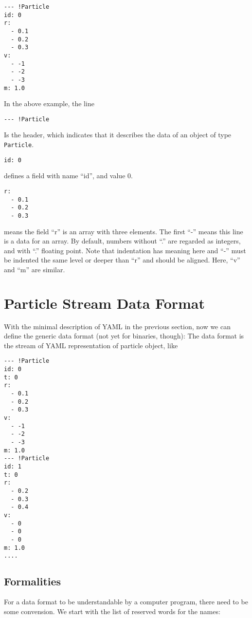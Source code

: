 \documentclass[5p,authoryear]{elsarticle}
\begin{document}
\begin{verbatim}
--- !Particle
id: 0
r:
  - 0.1
  - 0.2
  - 0.3
v:
  - -1
  - -2
  - -3
m: 1.0
\end{verbatim}

In the above example, the line

\begin{verbatim}
--- !Particle
\end{verbatim}
Is the header, which indicates that it describes the data of an object
of type {\tt Particle}.


\begin{verbatim}
id: 0
\end{verbatim}
defines a field with name ``id'', and value 0.
\begin{verbatim}
r:
  - 0.1
  - 0.2
  - 0.3
\end{verbatim}
means the field ``r'' is an array with three elements. The
first ``-'' means this line is a data for an array.
By default, numbers without ``.'' are regarded as integers, and with
``.'' floating point. Note that indentation has meaning here and ``-''
must be indented the same level or deeper than ``r'' and should be aligned.
Here,  ``v'' and ``m'' are similar.


\section{Particle Stream Data Format}


With the  minimal description of YAML in the previous section, now
we can define the generic data format (not yet for binaries, though):
The data format is the stream of YAML representation of particle
object, like

\begin{verbatim}
--- !Particle
id: 0
t: 0
r:
  - 0.1
  - 0.2
  - 0.3
v:
  - -1
  - -2
  - -3
m: 1.0
--- !Particle
id: 1
t: 0
r:
  - 0.2
  - 0.3
  - 0.4
v:
  - 0
  - 0
  - 0
m: 1.0
....
\end{verbatim}

\subsection{Formalities}

For a data format to be understandable by a computer program, there
need to be some convension. We start with the list of reserved words
for the names:
\end{document}
